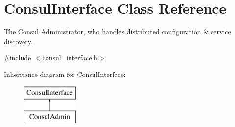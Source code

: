 \hypertarget{classConsulInterface}{\section{Consul\-Interface Class Reference}
\label{classConsulInterface}
}


The Consul Administrator, who handles distributed configuration \& service discovery.  




{\ttfamily \#include $<$consul\-\_\-interface.\-h$>$}

Inheritance diagram for Consul\-Interface\-:\begin{figure}[H]
\begin{center}
\leavevmode
\includegraphics[height=2.000000cm]{classConsulInterface}
\end{center}
\end{figure}
